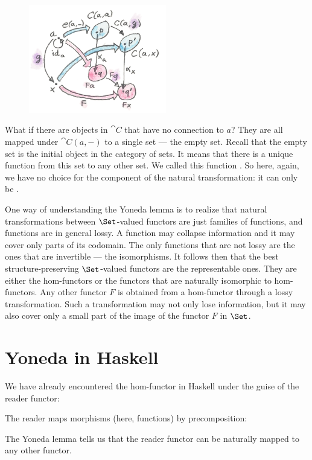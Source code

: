 \begin{figure}[H]
\centering
\includegraphics[width=60mm]{images/yoneda5.png}
\end{figure}

\noindent
What if there are objects in $\cat{C}$ that have no connection to
$a$? They are all mapped under $\cat{C}(a, -)$ to a single set
--- the empty set. Recall that the empty set is the initial object in
the category of sets. It means that there is a unique function from this
set to any other set. We called this function . So here,
again, we have no choice for the component of the natural
transformation: it can only be .

One way of understanding the Yoneda lemma is to realize that natural
transformations between $\Set$-valued functors are just families
of functions, and functions are in general lossy. A function may
collapse information and it may cover only parts of its codomain. The
only functions that are not lossy are the ones that are invertible ---
the isomorphisms. It follows then that the best structure-preserving
$\Set$-valued functors are the representable ones. They are either
the hom-functors or the functors that are naturally isomorphic to
hom-functors. Any other functor $F$ is obtained from a
hom-functor through a lossy transformation. Such a transformation may
not only lose information, but it may also cover only a small part of
the image of the functor $F$ in $\Set$.

\section{Yoneda in Haskell}

We have already encountered the hom-functor in Haskell under the guise
of the reader functor:

The reader maps morphisms (here, functions) by precomposition:

The Yoneda lemma tells us that the reader functor can be naturally
mapped to any other functor.

